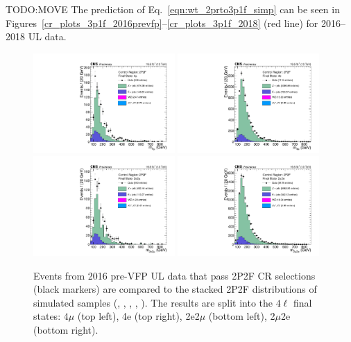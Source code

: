 TODO:MOVE The prediction of Eq.~\ref{eqn:wt_2prto3p1f_simp} can be seen in Figures~\ref{cr_plots_3p1f_2016prevfp}--\ref{cr_plots_3p1f_2018} (red line) for 2016--2018 UL data.
\begin{figure}[!htbp]
	\begin{center}
		\includegraphics[width=0.48\textwidth]{figures/higgsmassmeas/redbkg/cr/UL2016preVFP_CR_2P2F_4mu.pdf}
		\includegraphics[width=0.48\textwidth]{figures/higgsmassmeas/redbkg/cr/UL2016preVFP_CR_2P2F_4e.pdf}
		\includegraphics[width=0.48\textwidth]{figures/higgsmassmeas/redbkg/cr/UL2016preVFP_CR_2P2F_2e2mu.pdf}
		\includegraphics[width=0.48\textwidth]{figures/higgsmassmeas/redbkg/cr/UL2016preVFP_CR_2P2F_2mu2e.pdf}
		\caption{
			Events from 2016 pre-VFP UL data that pass 2P2F CR selections (black markers) 
			are compared to the stacked 2P2F distributions of simulated samples
			(\Zplusjets, \ttbarplusjets, \WZ, \ZZ, \Zgammastar).
			The results are split into the $4\ell$ final states:
            $4\mu$ (top left), 4e (top right), 2e2$\mu$ (bottom left), 2$\mu$2e (bottom right).
        }
		\label{cr_plots_2p2f_2016prevfp}
	\end{center}
\end{figure}
